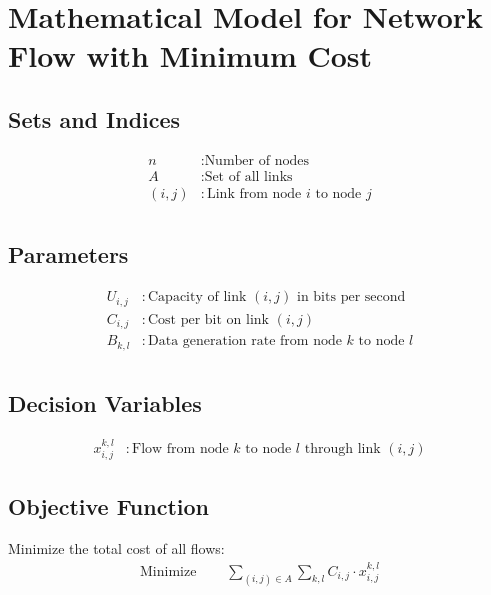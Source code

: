 \documentclass{article}
\begin{document}
\section*{Mathematical Model for Network Flow with Minimum Cost}

\subsection*{Sets and Indices}
\begin{align*}
n & : \text{Number of nodes} \\
A & : \text{Set of all links} \\
(i, j) & : \text{Link from node } i \text{ to node } j \\
\end{align*}

\subsection*{Parameters}
\begin{align*}
U_{i,j} & : \text{Capacity of link } (i, j) \text{ in bits per second} \\
C_{i,j} & : \text{Cost per bit on link } (i, j) \\
B_{k,l} & : \text{Data generation rate from node } k \text{ to node } l \\
\end{align*}

\subsection*{Decision Variables}
\begin{align*}
x_{i,j}^{k,l} & : \text{Flow from node } k \text{ to node } l \text{ through link } (i, j) 
\end{align*}

\subsection*{Objective Function}
Minimize the total cost of all flows:
\begin{align*}
\text{Minimize } \quad & \sum_{(i,j) \in A} \sum_{k,l} C_{i,j} \cdot x_{i,j}^{k,l}
\end{align*}
\end{document}

